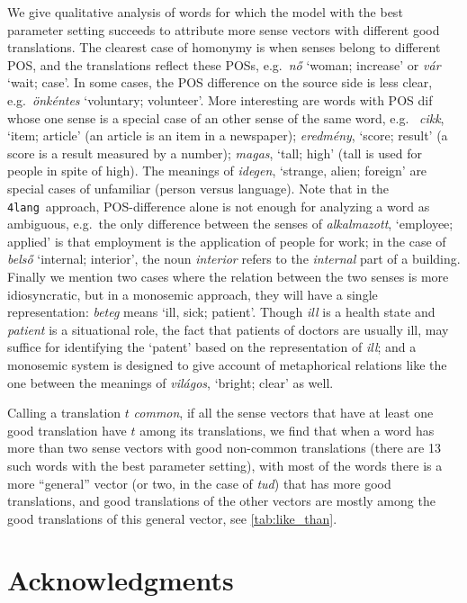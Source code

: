 \documentclass[11pt]{article}
\newcommand{\fl}{\texttt{4lang}}
\begin{document}
We give qualitative analysis of words for which the model with the best
parameter setting succeeds to attribute more sense vectors with different good
translations. The clearest case of homonymy is when senses belong to different
POS, and the translations reflect these POSs, e.g.~\emph{nő} `woman; increase'
or \emph{vár} `wait; case'.  In some cases, the POS difference on the source
side is less clear, e.g.~\emph{önkéntes} `voluntary; volunteer'. More
interesting are words with POS dif whose one sense is a special case of an
other sense of the same word, e.g.~ \emph{cikk}, `item; article' (an article is
an item in a newspaper); \emph{eredmény}, `score; result' (a score is a result
measured by a number); \emph{magas}, `tall; high' (tall is used for people in
spite of high). The meanings of \emph{idegen}, `strange, alien; foreign' are
special cases of unfamiliar (person versus language).  Note that in the
\fl~approach, POS-difference alone is not enough for analyzing a word as
ambiguous, e.g.~the only difference between the senses of \emph{alkalmazott},
`employee; applied' is that employment is the application of people for work;
in the case of \emph{belső} `internal; interior', the noun \emph{interior}
refers to the \emph{internal} part of a building. Finally we mention two cases
where the relation between the two senses is more idiosyncratic, but in a
monosemic approach, they will have a single representation: \emph{beteg} means
`ill, sick; patient'. Though \emph{ill} is a health state and \emph{patient} is
a situational role, the fact that patients of doctors are usually ill, may
suffice for identifying the `patent' based on the representation of \emph{ill};
and a monosemic system is designed to give account of metaphorical relations
like the one between the meanings of \emph{világos}, `bright; clear' as well.

Calling a translation $t$ \emph{common}, if all the sense vectors that have at
least one good translation have $t$ among its translations, we find that when a
word has more than two sense vectors with good non-common translations (there
are 13 such words with the best parameter setting), with most of the words
there is a more ``general'' vector (or two, in the case of \emph{tud}) that has
more good translations, and good translations of the other vectors are mostly
among the good translations of this general vector, see
\cref{tab:like_than}.

\section{Acknowledgments}
\end{document}
